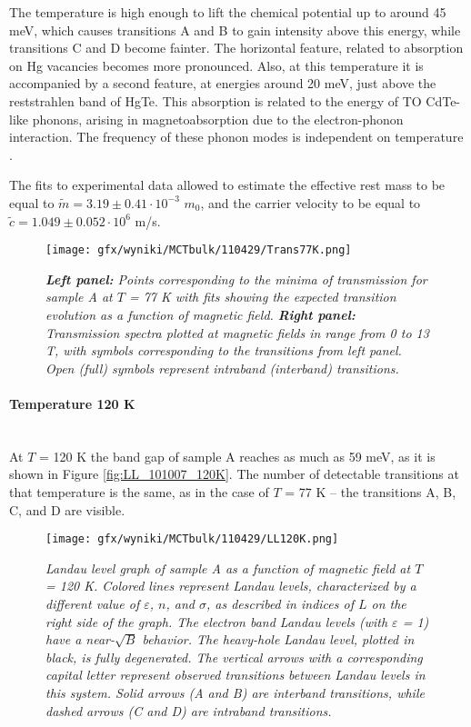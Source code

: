 \documentclass[titlepage,a4paper]{book}
\newcommand{\wciecie}{\quad\phantom{v}}
\newcommand{\myparagraph}[1]{\paragraph{#1}\mbox{}\\}
\begin{document}
The temperature is high enough to lift the chemical potential up to around 45 meV, which causes transitions A and B to gain intensity above this energy, while transitions C and D become fainter. The horizontal feature, related to absorption on Hg vacancies becomes more pronounced. Also, at this temperature it is accompanied by a second feature, at energies around 20 meV, just above the reststrahlen band of HgTe. This absorption is related to the energy of TO CdTe-like phonons, arising in magnetoabsorption due to the electron-phonon interaction. The frequency of these phonon modes is independent on temperature \cite{Sheregii_MCT_bulk}.

The fits to experimental data allowed to estimate the effective rest mass to be equal to $\tilde m = 3.19 \pm 0.41 \cdot 10^{-3}$ $m_0$, and the carrier velocity to be equal to $\tilde{c} = 1.049 \pm 0.052 \cdot 10^6$ m/s. 

\begin{figure}[H]
	\centering
	\texttt{[image: gfx/wyniki/MCTbulk/110429/Trans77K.png]}
	\vspace{-10pt}
	\caption{\textit{\textbf{Left panel:} Points corresponding to the minima of transmission for sample A at $T$ = 77 K with fits showing the expected transition evolution as a function of magnetic field. \textbf{Right panel:} Transmission spectra plotted at magnetic fields in range from 0 to 13 T, with symbols corresponding to the transitions from left panel. Open (full) symbols represent intraband (interband) transitions.}}
	\label{fig:Spectra_110429_77K}
\end{figure}


\myparagraph{Temperature 120 K}
\wciecie
At $T$ = 120 K the band gap of sample A reaches as much as 59 meV, as it is shown in Figure \ref{fig:LL_101007_120K}. The number of detectable transitions at that temperature is the same, as in the case of $T$ = 77 K -- the transitions A, B, C, and D are visible.  
\begin{figure}[H]
	\centering
	\texttt{[image: gfx/wyniki/MCTbulk/110429/LL120K.png]}
	\vspace{-10pt}
	\caption{\textit{Landau level graph of sample A as a function of magnetic field at $T$ = 120 K. Colored lines represent Landau levels, characterized by a different value of $\varepsilon$, $n$, and $\sigma$, as described in indices of $L$ on the right side of the graph. The electron band Landau levels (with $\varepsilon$ = 1) have a near-$\sqrt{B}$ behavior. The heavy-hole Landau level, plotted in black, is fully degenerated. The vertical arrows with a corresponding capital letter represent observed transitions between Landau levels in this system. Solid arrows (A and B) are interband transitions, while dashed arrows (C and D) are intraband transitions.}}
	\label{fig:LL_110429_120K}
\end{figure}
\end{document}
